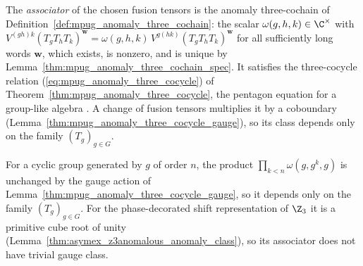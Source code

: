 The \emph{associator} of the chosen fusion tensors is the anomaly
three-cochain of Definition~\ref{def:mpug_anomaly_three_cochain}: the scalar
$\omega(g,h,k)\in\C^\times$ with
$V^{(gh)k}(T_gT_hT_k)^{\mathbf w}=\omega(g,h,k)\,V^{g(hk)}(T_gT_hT_k)^{\mathbf w}$
for all sufficiently long words $\mathbf w$, which exists, is nonzero, and is
unique by Lemma~\ref{thm:mpug_anomaly_three_cochain_spec}. It satisfies the
three-cocycle relation (\ref{eq:mpug_anomaly_three_cocycle}) of
Theorem~\ref{thm:mpug_anomaly_three_cocycle}, the pentagon equation for a
group-like algebra \cite[Section~4]{GarreRubio2023MPOSym}. A change of fusion
tensors multiplies it by a coboundary
(Lemma~\ref{thm:mpug_anomaly_three_cocycle_gauge}), so its class depends only
on the family $(T_g)_{g\in G}$.

\begin{remark}%
    \label{rem:mpoalg_associator_examples}
    For a cyclic group generated by $g$ of order $n$, the product
    $\prod_{k<n}\omega(g,g^k,g)$ is unchanged by the gauge action of
    Lemma~\ref{thm:mpug_anomaly_three_cocycle_gauge}, so it depends only on the
    family $(T_g)_{g\in G}$. For the phase-decorated shift representation of
    $\Z_3$ it is a primitive cube root of unity
    (Lemma~\ref{thm:asymex_z3anomalous_anomaly_class}), so its associator
    does not have trivial gauge class.
\end{remark}

